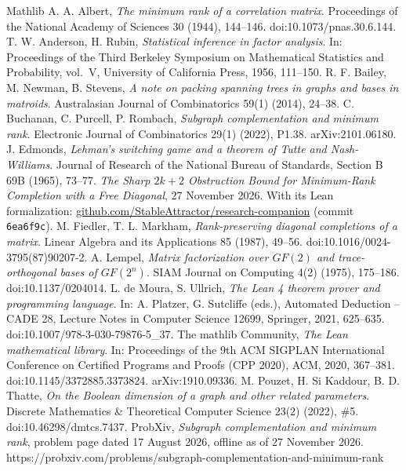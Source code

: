 \documentclass[11pt,letterpaper,reqno]{amsart}
\theoremstyle{spaced}
\begin{document}
\begin{thebibliography}{Mathlib}
\footnotesize\linespread{1}\selectfont\setlength{\itemsep}{0pt}\setlength{\parskip}{0pt}
 A. A. Albert, \emph{The minimum rank of a correlation matrix}. Proceedings of the National Academy of Sciences 30 (1944), 144--146. doi:10.1073/pnas.30.6.144.
 T. W. Anderson, H. Rubin, \emph{Statistical inference in factor analysis}. In: Proceedings of the Third Berkeley Symposium on Mathematical Statistics and Probability, vol.~V, University of California Press, 1956, 111--150.
 R. F. Bailey, M. Newman, B. Stevens, \emph{A note on packing spanning trees in graphs and bases in matroids}. Australasian Journal of Combinatorics 59(1) (2014), 24--38.
 C. Buchanan, C. Purcell, P. Rombach, \emph{Subgraph complementation and minimum rank}. Electronic Journal of Combinatorics 29(1) (2022), P1.38. arXiv:2101.06180.
 J. Edmonds, \emph{Lehman's switching game and a theorem of Tutte and Nash-Williams}. Journal of Research of the National Bureau of Standards, Section B 69B (1965), 73--77.
 \emph{The Sharp \(2k+2\) Obstruction Bound for Minimum-Rank Completion with a Free Diagonal}, 27 November 2026. With its Lean formalization: \href{https://github.com/StableAttractor/research-companion/tree/6ea6f9c5e396a67cb100720ea44652ff521a2db8}{github.com/\allowbreak{}StableAttractor/\allowbreak{}\mbox{research-companion}} (commit \texttt{6ea6f9c}).
 M. Fiedler, T. L. Markham, \emph{Rank-preserving diagonal completions of a matrix}. Linear Algebra and its Applications 85 (1987), 49--56. doi:10.1016/0024-3795(87)90207-2.
 A. Lempel, \emph{Matrix factorization over \(GF(2)\) and trace-orthogonal bases of \(GF(2^n)\)}. SIAM Journal on Computing 4(2) (1975), 175--186. doi:10.1137/0204014.
 L. de Moura, S. Ullrich, \emph{The Lean 4 theorem prover and programming language}. In: A. Platzer, G. Sutcliffe (eds.), Automated Deduction -- CADE 28, Lecture Notes in Computer Science 12699, Springer, 2021, 625--635. doi:10.1007/978-3-030-79876-5\_37.
 The mathlib Community, \emph{The Lean mathematical library}. In: Proceedings of the 9th ACM SIGPLAN International Conference on Certified Programs and Proofs (CPP 2020), ACM, 2020, 367--381. doi:10.1145/3372885.3373824. arXiv:1910.09336.
 M. Pouzet, H. Si Kaddour, B. D. Thatte, \emph{On the Boolean dimension of a graph and other related parameters}. Discrete Mathematics \& Theoretical Computer Science 23(2) (2022), \#5. doi:10.46298/dmtcs.7437.
 ProbXiv, \emph{Subgraph complementation and minimum rank}, problem page dated 17 August 2026, offline as of 27 November 2026. https://probxiv.com/problems/subgraph-complementation-and-minimum-rank
\end{thebibliography}
\end{document}
